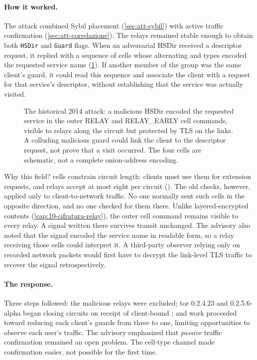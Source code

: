 \paragraph{How it worked.} The attack combined Sybil placement (\cref{sec:att-sybil}) with active traffic confirmation (\cref{sec:att-correlazione}). The relays remained stable enough to obtain both \texttt{HSDir} and \texttt{Guard} flags. When an adversarial HSDir received a descriptor request, it replied with a sequence of cells whose alternating  and  types encoded the requested service name (\cref{fig:relayearly}). If another member of the group was the same client's guard, it could read this sequence and associate the client with a request for that service's descriptor, without establishing that the service was actually visited.

\begin{figure}[htbp]
\centering

\caption{The historical 2014 attack: a malicious HSDir encoded the requested service in the outer RELAY and RELAY\_EARLY cell commands, visible to relays along the circuit but protected by TLS on the links. A colluding malicious guard could link the client to the descriptor request, not prove that a visit occurred. The four cells are schematic, not a complete onion-address encoding.}
\label{fig:relayearly}
\end{figure}

Why this field?  cells constrain circuit length: clients must use them for extension requests, and relays accept at most eight per circuit (). The old checks, however, applied only to client-to-network traffic. No one normally sent such cells in the opposite direction, and no one checked for them there. Unlike layered-encrypted contents (\cref{cap:10-cifratura-relay}), the outer cell command remains visible to every relay. A signal written there survives transit unchanged. The advisory also noted that the signal encoded the service name in readable form, so a relay receiving those cells could interpret it. A third-party observer relying only on recorded network packets would first have to decrypt the link-level TLS traffic to recover the signal retrospectively.

\paragraph{The response.} Three steps followed: the malicious relays were excluded; tor 0.2.4.23 and 0.2.5.6-alpha began closing circuits on receipt of client-bound ; and work proceeded toward reducing each client's guards from three to one, limiting opportunities to observe each user's traffic. The advisory emphasized that \emph{passive} traffic confirmation remained an open problem. The cell-type channel made confirmation easier, not possible for the first time.

